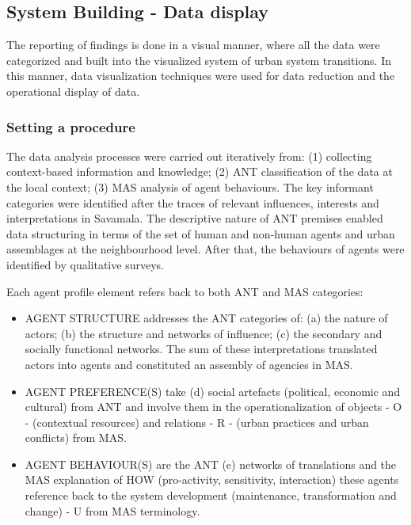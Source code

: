 \documentclass[11pt]{report}
\begin{document}
\subsection{System Building - Data display}

The reporting of findings is done in a visual manner, where all the data were categorized and built into the visualized system of urban system transitions. In this manner, data visualization techniques were used for data reduction and the operational display of data.

\subsubsection{Setting a procedure}

The data analysis processes were carried out iteratively from: (1) collecting context-based information and knowledge; (2) ANT classification of the data at the local context; (3) MAS analysis of agent behaviours. The key informant categories were identified after the traces of relevant influences, interests and interpretations in Savamala. The descriptive nature of ANT premises enabled data structuring in terms of the set of human and non-human agents and urban assemblages at the neighbourhood level. After that, the behaviours of agents were identified by qualitative surveys.

Each agent profile element refers back to both ANT and MAS categories:

\begin{itemize}
\item AGENT STRUCTURE addresses the ANT categories of: (a) the nature of actors; (b) the structure and networks of influence; (c) the secondary and socially functional networks. The sum of these interpretations translated actors into agents and constituted an assembly of agencies in MAS. 
\item AGENT PREFERENCE(S) take (d) social artefacts (political, economic and cultural) from ANT and involve them in the operationalization of objects - O - (contextual resources) and relations - R - (urban practices and urban conflicts) from MAS.
\item AGENT BEHAVIOUR(S) are the ANT (e) networks of translations and the MAS explanation of HOW (pro-activity, sensitivity, interaction) these agents reference back to the system development (maintenance, transformation and change) - U from MAS terminology.
\end{itemize}
\end{document}
